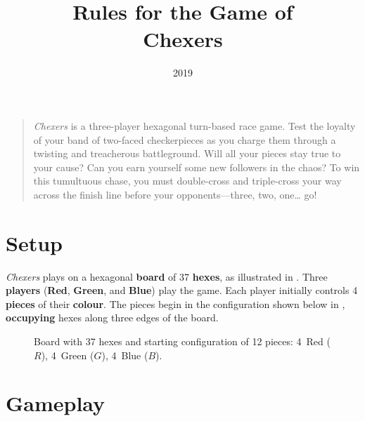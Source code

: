 \documentclass[]{article}
\title{
    {\LARGE Rules for the Game of}
    \\[1ex]
    {\Huge\bf Chexers}
}
\author{
    \textbf{Matthew Farrugia-Roberts}
    \\
    \textit{The University of Melbourne}
    \\
    \href
      {mailto:matt.farrugia@unimelb.edu.au}
      {\tt matt.farrugia@unimelb.edu.au}
}
\date{2019}
\newcommand{\piece}[4] {
    \node[draw,circle,minimum size=6.8mm,fill=white] at ({#1}, {#2}) {};
    \node[draw,circle,minimum size=5.8mm,very thick,{#3}] at ({#1}, {#2}) {};
    \node[] at ({#1}, {#2}) {${#4}$};
}
\newcommand{\board} {
    \tikzset{
        hex/.style={
            regular polygon,
            regular polygon sides=6,
            minimum size=10mm,
            inner sep=0mm,
            outer sep=0mm,
            rotate=30,
            draw
        },
        x={(4.33mm,7.5mm)},
        y={(8.66mm,0mm)}
    }
    \foreach \r/\q in {
                 +3/-3,+3/-2,+3/-1,+3/+0,
              +2/-3,+2/-2,+2/-1,+2/+0,+2/+1,
           +1/-3,+1/-2,+1/-1,+1/+0,+1/+1,+1/+2,
        +0/-3,+0/-2,+0/-1,+0/+0,+0/+1,+0/+2,+0/+3,
           -1/-2,-1/-1,-1/+0,-1/+1,-1/+2,-1/+3,
              -2/-1,-2/+0,-2/+1,-2/+2,-2/+3,
                 -3/+0,-3/+1,-3/+2,-3/+3,
    }
        \node[hex,fill=black!5] at (\r, \q) {};
}
\begin{document}
\maketitle

\vfill

\begin{quote}
\emph{Chexers} is a three-player hexagonal turn-based race game. Test
the loyalty of your band of two-faced checkerpieces as you charge them
through a twisting and treacherous battleground. Will all your pieces
stay true to your cause? Can you earn yourself some new followers in the
chaos? To win this tumultuous chase, you must double-cross and
triple-cross your way across the finish line before your
opponents---three, two, one\ldots{} go!
\end{quote}

\vfill

\section*{Setup}

\emph{Chexers} plays on a hexagonal \textbf{board} of 37 \textbf{hexes},
as illustrated in .
%
Three \textbf{players} (\textbf{Red}, \textbf{Green}, and \textbf{Blue})
play the game.
Each player initially controls 4 \textbf{pieces} of their \textbf{colour}.
The pieces begin in the configuration shown below in ,
\textbf{occupying} hexes along three edges of the board.

\begin{figure}[ht!]
    \centering
    \caption{
    \label{fig:board}
        Board with 37 hexes and starting configuration of 12 pieces:
        4~Red ($R$), 4~Green ($G$), 4~Blue ($B$).
    }
\end{figure}

\vfill

\newpage

\section*{Gameplay}
\end{document}

